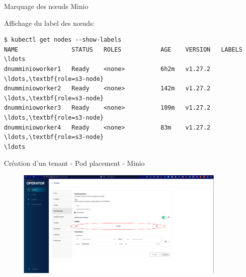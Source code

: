 \begin{frame}[fragile]{Marquage des n\oe{}uds Minio}

   Affichage du label des n\oe{}uds:
   \begin{tiny}
\begin{Verbatim}[commandchars=\\\{\}]
$ kubectl get nodes --show-labels
NAME               STATUS   ROLES           AGE    VERSION   LABELS
\ldots
dnumminioworker1   Ready    <none>          6h2m   v1.27.2   \ldots,\textbf{role=s3-node}
dnumminioworker2   Ready    <none>          142m   v1.27.2   \ldots,\textbf{role=s3-node}
dnumminioworker3   Ready    <none>          109m   v1.27.2   \ldots,\textbf{role=s3-node}
dnumminioworker4   Ready    <none>          83m    v1.27.2   \ldots,\textbf{role=s3-node}
\ldots

\end{Verbatim}
   \end{tiny}

\end{frame}


\begin{frame}[fragile]{Création d'un tenant - Pod placement - Minio}

\begin{figure}
\begin{center}
\includegraphics[angle=0, width=0.9\textwidth, height=0.9\textheight]{images/pod_placement.eps}
\end{center}
\end{figure}

\end{frame}


